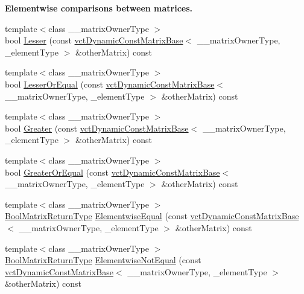 \begin{Indent}{\bf Elementwise comparisons between matrices.}
\begin{DoxyCompactItemize}
\item 
{\footnotesize template$<$class \-\_\-\-\_\-matrix\-Owner\-Type $>$ }\\bool \hyperlink{classvct_dynamic_const_matrix_base_a467bfe8bb9c5d635a69f30f64f163317}{Lesser} (const \hyperlink{classvct_dynamic_const_matrix_base}{vct\-Dynamic\-Const\-Matrix\-Base}$<$ \-\_\-\-\_\-matrix\-Owner\-Type, \-\_\-element\-Type $>$ \&other\-Matrix) const 
\item 
{\footnotesize template$<$class \-\_\-\-\_\-matrix\-Owner\-Type $>$ }\\bool \hyperlink{classvct_dynamic_const_matrix_base_adefd715fcdc4067de82bfa98e298afde}{Lesser\-Or\-Equal} (const \hyperlink{classvct_dynamic_const_matrix_base}{vct\-Dynamic\-Const\-Matrix\-Base}$<$ \-\_\-\-\_\-matrix\-Owner\-Type, \-\_\-element\-Type $>$ \&other\-Matrix) const 
\item 
{\footnotesize template$<$class \-\_\-\-\_\-matrix\-Owner\-Type $>$ }\\bool \hyperlink{classvct_dynamic_const_matrix_base_ae99bf3423dcaea6f83a4e1ae8cd75f95}{Greater} (const \hyperlink{classvct_dynamic_const_matrix_base}{vct\-Dynamic\-Const\-Matrix\-Base}$<$ \-\_\-\-\_\-matrix\-Owner\-Type, \-\_\-element\-Type $>$ \&other\-Matrix) const 
\item 
{\footnotesize template$<$class \-\_\-\-\_\-matrix\-Owner\-Type $>$ }\\bool \hyperlink{classvct_dynamic_const_matrix_base_aa422fb2c17e117206ff444541eeab398}{Greater\-Or\-Equal} (const \hyperlink{classvct_dynamic_const_matrix_base}{vct\-Dynamic\-Const\-Matrix\-Base}$<$ \-\_\-\-\_\-matrix\-Owner\-Type, \-\_\-element\-Type $>$ \&other\-Matrix) const 
\item 
{\footnotesize template$<$class \-\_\-\-\_\-matrix\-Owner\-Type $>$ }\\\hyperlink{classvct_dynamic_const_matrix_base_ac71d88dda7abaaeb2276b83f2e49def7}{Bool\-Matrix\-Return\-Type} \hyperlink{classvct_dynamic_const_matrix_base_af08ccedcbb1f2c8fc7a3df18ee749b4d}{Elementwise\-Equal} (const \hyperlink{classvct_dynamic_const_matrix_base}{vct\-Dynamic\-Const\-Matrix\-Base}$<$ \-\_\-\-\_\-matrix\-Owner\-Type, \-\_\-element\-Type $>$ \&other\-Matrix) const 
\item 
{\footnotesize template$<$class \-\_\-\-\_\-matrix\-Owner\-Type $>$ }\\\hyperlink{classvct_dynamic_const_matrix_base_ac71d88dda7abaaeb2276b83f2e49def7}{Bool\-Matrix\-Return\-Type} \hyperlink{classvct_dynamic_const_matrix_base_add4e2d3b11d480a9b10c15e5f13e0f2c}{Elementwise\-Not\-Equal} (const \hyperlink{classvct_dynamic_const_matrix_base}{vct\-Dynamic\-Const\-Matrix\-Base}$<$ \-\_\-\-\_\-matrix\-Owner\-Type, \-\_\-element\-Type $>$ \&other\-Matrix) const 

\end{DoxyCompactItemize}
\end{Indent}
